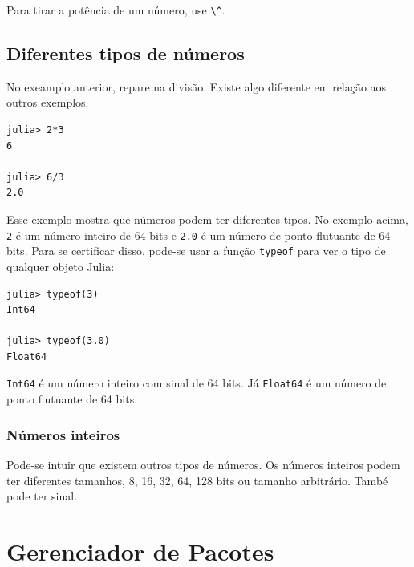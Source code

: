 \documentclass[
  notoc %
]{tufte-book}
\newcommand{\passthrough}[1]{#1}
\begin{document}
Para tirar a potência de um número, use \passthrough{\lstinline!\^!}.

\hypertarget{sec:pr-tipo}{%
\section{Diferentes tipos de números}\label{sec:pr-tipo}}

No exeamplo anterior, repare na divisão. Existe algo diferente em
relação aos outros exemplos.

\begin{lstlisting}
julia> 2*3
6

julia> 6/3
2.0
\end{lstlisting}

Esse exemplo mostra que números podem ter diferentes tipos. No exemplo
acima, \passthrough{\lstinline!2!} é um número inteiro de 64 bits e
\passthrough{\lstinline!2.0!} é um número de ponto flutuante de 64 bits.
Para se certificar disso, pode-se usar a função
\passthrough{\lstinline!typeof!} para ver o tipo de qualquer objeto
Julia:

\begin{lstlisting}
julia> typeof(3)
Int64

julia> typeof(3.0)
Float64
\end{lstlisting}

\passthrough{\lstinline!Int64!} é um número inteiro com sinal de 64
bits. Já \passthrough{\lstinline!Float64!} é um número de ponto
flutuante de 64 bits.

\hypertarget{nuxfameros-inteiros}{%
\subsection{Números inteiros}\label{nuxfameros-inteiros}}

Pode-se intuir que existem outros tipos de números. Os números inteiros
podem ter diferentes tamanhos, 8, 16, 32, 64, 128 bits ou tamanho
arbitrário. També pode ter sinal.

\hypertarget{sec:pkg}{%
\chapter{Gerenciador de Pacotes}\label{sec:pkg}}

\backmatter
\end{document}
